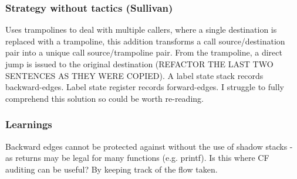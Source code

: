 \subsubsection{Strategy without tactics (Sullivan)}
Uses trampolines to deal with multiple callers, where a single destination is replaced with a trampoline, this addition transforms a call source/destination pair into a unique call source/trampoline pair. From the trampoline, a direct jump is issued to the original destination (REFACTOR THE LAST TWO SENTENCES AS THEY WERE COPIED). A label state stack records backward-edges. Label state register records forward-edges. I struggle to fully comprehend this solution so could be worth re-reading.



\subsubsection{Learnings}
Backward edges cannot be protected against without the use of shadow stacks - as returns may be legal for many functions (e.g. printf). Is this where CF auditing can be useful? By keeping track of the flow taken.